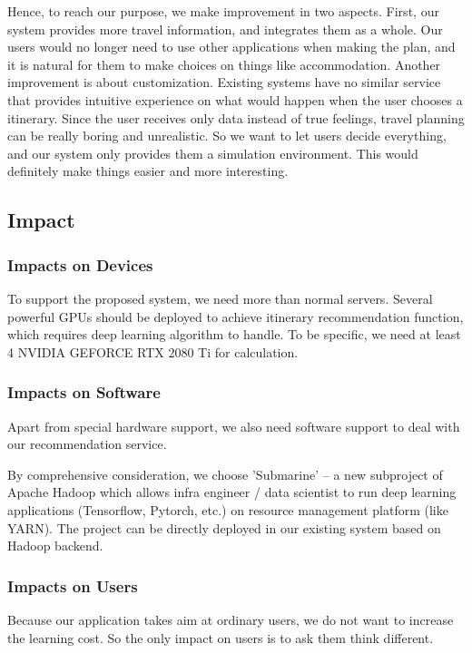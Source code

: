 \documentclass[10pt]{article}
\begin{document}
Hence, to reach our purpose, we make improvement in two aspects. First, our system provides more travel information, and integrates them as a whole. Our users would no longer need to use other applications when making the plan, and it is natural for them to make choices on things like accommodation. Another improvement is about customization. Existing systems have no similar service that provides intuitive experience on what would happen when the user chooses a itinerary. Since the user receives only data instead of true feelings, travel planning can be really boring and unrealistic. So we want to let users decide everything, and our system only provides them a simulation environment. This would definitely make things easier and more interesting.

\subsection{Impact}
\subsubsection{Impacts on Devices}
To support the proposed system, we need more than normal servers. Several powerful GPUs should be deployed to achieve itinerary recommendation function, which requires deep learning algorithm to handle. To be specific, we need at least 4 NVIDIA GEFORCE RTX 2080 Ti for calculation.

\subsubsection{Impacts on Software}
Apart from special hardware support, we also need software support to deal with our recommendation service. 

By comprehensive consideration, we choose 'Submarine' -- a new subproject of Apache Hadoop which allows infra engineer / data scientist to run deep learning applications (Tensorflow, Pytorch, etc.) on resource management platform (like YARN). The project can be directly deployed in our existing system based on Hadoop backend.

\subsubsection{Impacts on Users}
Because our application takes aim at ordinary users, we do not want to increase the learning cost. So the only impact on users is to ask them think different.
\end{document}
